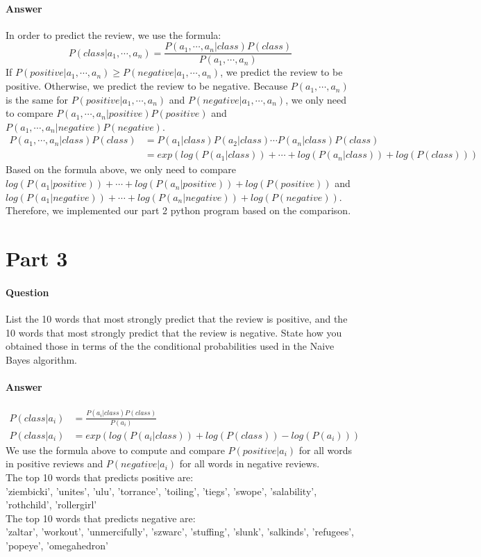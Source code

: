 \documentclass[11pt,twoside]{article}
\begin{document}
\paragraph{Answer}
In order to predict the review, we use the formula:
\[P(class | a_1, \cdots, a_n) = \frac{P(a_1, \cdots, a_n | class) P(class)}{P(a_1, \cdots, a_n)}\]
If $P(positive|a_1, \cdots, a_n) \geq P(negative|a_1, \cdots, a_n)$, we predict the review to be positive. Otherwise, we predict the review to be negative. Because $P(a_1, \cdots, a_n)$ is the same for $P(positive|a_1, \cdots, a_n)$ and $P(negative|a_1, \cdots, a_n)$, we only need to compare $P(a_1, \cdots, a_n | positive) P(positive)$ and\\ $P(a_1, \cdots, a_n | negative) P(negative)$.
\begin{align*}
P(a_1, \cdots, a_n | class) P(class) &= P(a_1|class) P(a_2|class)\cdots P(a_n|class)P(class)\\
&= exp(log(P(a_1|class))+\cdots+log(P(a_n|class))+log(P(class)))
\end{align*}
Based on the formula above, we only need to compare $log(P(a_1|positive))+\cdots+log(P(a_n|positive))+log(P(positive))$ and $log(P(a_1|negative))+\cdots+log(P(a_n|negative))+log(P(negative))$. Therefore, we implemented our part 2 python program based on the comparison.
\clearpage

\section*{Part 3}

\paragraph{Question}
List the 10 words that most strongly predict that the review is positive, and the 10 words that most strongly predict that the review is negative. State how you obtained those in terms of the the conditional probabilities used in the Naive Bayes algorithm.

\paragraph{Answer}
\begin{align*}
P(class | a_i) &= \frac{P(a_i | class) P(class)}{P(a_i)}\\
P(class | a_i) &= exp(log(P(a_i | class)) + log(P(class)) - log(P(a_i)))
\end{align*}
We use the formula above to compute and compare $P(positive | a_i)$ for all words in positive reviews and $P(negative | a_i)$ for all words in negative reviews.\\
The top 10 words that predicts positive are:\\
'ziembicki', 'unites', 'ulu', 'torrance', 'toiling', 'tiegs', 'swope', 'salability', 'rothchild', 'rollergirl'\\
The top 10 words that predicts negative are:\\
'zaltar', 'workout', 'unmercifully', 'szwarc', 'stuffing', 'slunk', 'salkinds', 'refugees', 'popeye', 'omegahedron'\\
\clearpage
\end{document}
